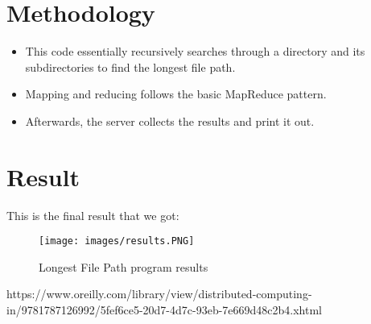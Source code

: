 \documentclass[]{article}
\begin{document}
\section{Methodology}
\begin{itemize}
    \item This code essentially recursively searches through a directory and its subdirectories to find the longest file path.
    \item Mapping and reducing follows the basic MapReduce pattern. 
    \item Afterwards, the server collects the results and print it out.
\end{itemize}

\section{Result}
\noindent%
This is the final result that we got:
\begin{figure}[h]
    \centering
    \texttt{[image: images/results.PNG]}
    \caption{Longest File Path program results}
    \label{fig:protocol}
\end{figure}

\begin{thebibliography}{9}
https://www.oreilly.com/library/view/distributed-computing-in/9781787126992/5fef6ce5-20d7-4d7c-93eb-7e669d48c2b4.xhtml
\end{thebibliography}
\end{document}
